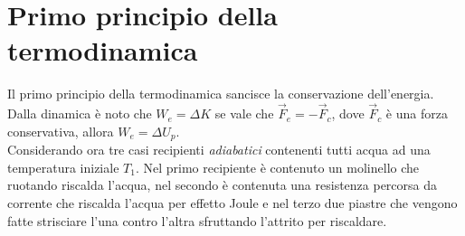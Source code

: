 \documentclass{article}
\begin{document}
\section*{Primo principio della termodinamica}
Il primo principio della termodinamica sancisce la conservazione dell'energia. Dalla dinamica è noto che $W_e=\Delta K$ se vale che $\vec{F}_e=- \vec{F}_c$, dove $\vec{F}_c$ è una forza conservativa, allora $W_e=\Delta U_p$. \\
Considerando ora tre casi recipienti \textit{adiabatici} contenenti tutti acqua ad una temperatura iniziale $T_1$. Nel primo recipiente è contenuto un molinello che ruotando riscalda l'acqua, nel secondo è contenuta una resistenza percorsa da corrente che riscalda l'acqua per effetto Joule e nel terzo due piastre che vengono fatte strisciare l'una contro l'altra sfruttando l'attrito per riscaldare.  
\end{document}
